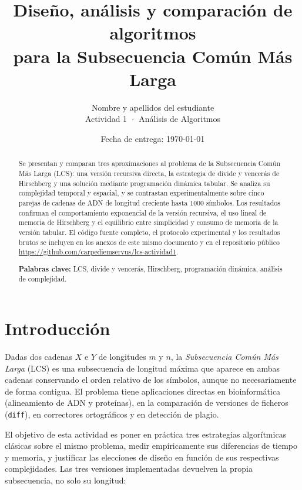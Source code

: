 \documentclass[11pt,a4paper]{article}
\title{\vspace{-1.5cm}\textbf{Diseño, análisis y comparación de algoritmos\\para la Subsecuencia Común Más Larga}}
\author{Nombre y apellidos del estudiante \\ Actividad 1 · Análisis de Algoritmos}
\date{Fecha de entrega: \today}
\begin{document}
\maketitle
\vspace{-0.6cm}

\begin{abstract}
\normalsize\noindent
Se presentan y comparan tres aproximaciones al problema de la Subsecuencia
Común Más Larga (LCS): una versión recursiva directa, la estrategia de
divide y vencerás de Hirschberg y una solución mediante programación
dinámica tabular. Se analiza su complejidad temporal y espacial, y se
contrastan experimentalmente sobre cinco parejas de cadenas de ADN de
longitud creciente hasta 1000 símbolos. Los resultados confirman el
comportamiento exponencial de la versión recursiva, el uso lineal de
memoria de Hirschberg y el equilibrio entre simplicidad y consumo de
memoria de la versión tabular. El código fuente completo, el protocolo
experimental y los resultados brutos se incluyen en los anexos de este
mismo documento y en el repositorio público
\url{https://github.com/carpediemservus/lcs-actividad1}.

\medskip
\noindent\textbf{Palabras clave:} LCS, divide y vencerás, Hirschberg,
programación dinámica, análisis de complejidad.
\end{abstract}

\section{Introducción}

Dadas dos cadenas $X$ e $Y$ de longitudes $m$ y $n$, la
\emph{Subsecuencia Común Más Larga} (LCS) es una subsecuencia de
longitud máxima que aparece en ambas cadenas conservando el orden
relativo de los símbolos, aunque no necesariamente de forma contigua.
El problema tiene aplicaciones directas en bioinformática (alineamiento
de ADN y proteínas), en la comparación de versiones de ficheros
(\texttt{diff}), en correctores ortográficos y en detección de plagio.

El objetivo de esta actividad es poner en práctica tres estrategias
algorítmicas clásicas sobre el mismo problema, medir empíricamente sus
diferencias de tiempo y memoria, y justificar las elecciones de diseño
en función de sus respectivas complejidades. Las tres versiones
implementadas devuelven la propia subsecuencia, no solo su longitud:
\end{document}
